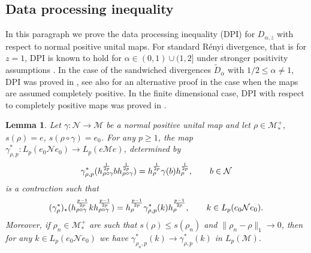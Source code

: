 \documentclass[12pt]{article}
\newtheorem{lemma}[theorem]{Lemma}
\theoremstyle{definition}
\theoremstyle{remark}
\numberwithin{equation}{section}
\def\Me{\mathcal M}
\def\Ne{\mathcal N}
\begin{document}
\subsection{Data processing inequality}


In this paragraph we prove the data processing inequality (DPI) for $D_{\alpha,z}$ with respect to normal
positive unital maps. For standard R\'enyi divergence, that is for $z=1$, DPI is known to
hold for $\alpha\in (0,1)\cup (1,2]$ under stronger positivity assumptions
\cite{hiai2018quantum}. In the case of the sandwiched divergences $\tilde D_\alpha$ with
$1/2\le \alpha \ne 1$, DPI was proved in \cite{jencova2018renyi,
jencova2021renyi}, see also \cite{berta2018renyi} for an alternative proof in the case
when the maps are assumed completely positive. In the finite dimensional case, DPI with
respect to completely positive maps was proved in \cite{zhang2020fromwyd}.


\begin{lemma}\label{lemma:pcontraction} Let $\gamma:\Ne\to \Me$ be a normal positive unital map and
let $\rho\in \Me_*^+$, $s(\rho)=e$, $s(\rho\circ\gamma)=e_0$.
For any $p\ge 1$, the map $\gamma^*_{\rho,p}:L_p(e_0 \Ne e_0)\to L_p(e\Me e)$, determined
by
\[
\gamma^*_{\rho,p}(h_{\rho\circ\gamma}^{1\over 2p}bh^{1\over
2p}_{\rho\circ\gamma})=h_\rho^{1\over 2p}\gamma(b) h_\rho^{1\over 2p},\qquad b\in \Ne
\]
is a contraction such that 
\[
(\gamma^*_\rho)_*(h_{\rho\circ\gamma}^{p-1\over 2p}kh_{\rho\circ\gamma}^{p-1\over
2p})=h_\rho^{p-1\over 2p}\gamma^*_{\rho,p}(k)h_\rho^{p-1\over 2p},\qquad k\in L_p(e_0 \Ne
e_0).
\]
Moreover, if $\rho_n\in \Me_*^+$ are such that $s(\rho)\le s(\rho_n)$ and
$\|\rho_n-\rho\|_1\to 0$, then for any $k\in L_p(e_0 \Ne e_0)$ we have
$\gamma^*_{\rho_n,p}(k)\to \gamma^*_{\rho,p}(k)$ in $L_p(\Me)$.

\end{lemma}
\end{document}
